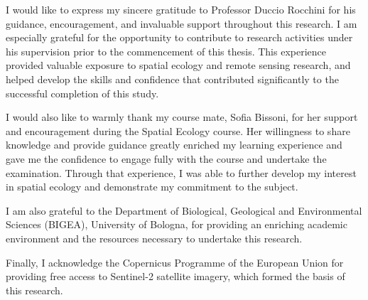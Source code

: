 \documentclass[a4paper,12pt]{report}
\begin{document}
I would like to express my sincere gratitude to Professor Duccio Rocchini for his guidance, encouragement, and invaluable support throughout this research. I am especially grateful for the opportunity to contribute to research activities under his supervision prior to the commencement of this thesis. This experience provided valuable exposure to spatial ecology and remote sensing research, and helped develop the skills and confidence that contributed significantly to the successful completion of this study.

I would also like to warmly thank my course mate, Sofia Bissoni, for her support and encouragement during the Spatial Ecology course. Her willingness to share knowledge and provide guidance greatly enriched my learning experience and gave me the confidence to engage fully with the course and undertake the examination. Through that experience, I was able to further develop my interest in spatial ecology and demonstrate my commitment to the subject.

I am also grateful to the Department of Biological, Geological and Environmental Sciences (BIGEA), University of Bologna, for providing an enriching academic environment and the resources necessary to undertake this research.

Finally, I acknowledge the Copernicus Programme of the European Union for providing free access to Sentinel-2 satellite imagery, which formed the basis of this research.
     
\end{document}
